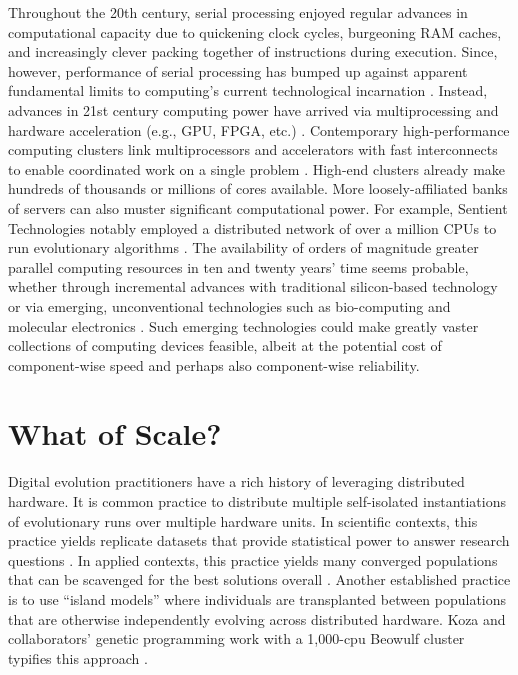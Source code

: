 Throughout the 20th century, serial processing enjoyed regular advances in computational capacity due to quickening clock cycles, burgeoning RAM caches, and increasingly clever packing together of instructions during execution.
Since, however, performance of serial processing has bumped up against apparent fundamental limits to computing’s current technological incarnation \cite{sutter2005free}.
Instead, advances in 21st century computing power have arrived via multiprocessing \cite[p.~55]{hennessy2011computer} and hardware acceleration (e.g., GPU, FPGA, etc.) \cite{che2008accelerating}.
Contemporary high-performance computing clusters link multiprocessors and accelerators with fast interconnects to enable coordinated work on a single problem \cite[p.~436]{hennessy2011computer}.
High-end clusters already make hundreds of thousands or millions of cores available. More loosely-affiliated banks of servers can also muster significant computational power.
For example, Sentient Technologies notably employed a distributed network of over a million CPUs to run evolutionary algorithms \cite{miikkulainen2019evolving}.
The availability of orders of magnitude greater parallel computing resources in ten and twenty years’ time seems probable, whether through incremental advances with traditional silicon-based technology or via emerging, unconventional technologies such as bio-computing \cite{benenson2009biocomputers} and molecular electronics \cite{xiang2016molecular}.
Such emerging technologies could make greatly vaster collections of computing devices feasible, albeit at the potential cost of component-wise speed \cite{bonnet2013amplifying, ellenbogen2000architectures} and perhaps also component-wise reliability.

\section{What of Scale?}

Digital evolution practitioners have a rich history of leveraging distributed hardware.
It is common practice to distribute multiple self-isolated instantiations of evolutionary runs over multiple hardware units.
In scientific contexts, this practice yields replicate datasets that provide statistical power to answer research questions \cite{dolson2017spatial}.
In applied contexts, this practice yields many converged populations that can be scavenged for the best solutions overall \cite{hornby2006automated}.
Another established practice is to use ``island models'' where individuals are transplanted between populations that are otherwise independently evolving across distributed hardware.
Koza and collaborators’ genetic programming work with a 1,000-cpu Beowulf cluster typifies this approach \cite{bennett1999building}.

